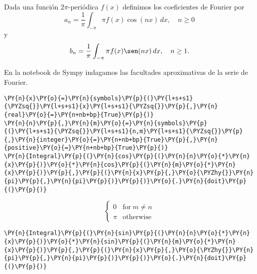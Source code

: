 \begin{definicion}{}
Dada una función $2\pi$-periódica $f(x)$ definimos los coeficientes de Fourier por
\begin{equation}
a_n=\frac{1}{\pi} \int_{-\pi}{\pi} f(x)\cos(nx)\,dx,\quad n\geq 0
\end{equation}
y 
\begin{equation}
b_n=\frac{1}{\pi} \int_{-\pi}{\pi} f(x)\sen(nx)\,dx,\quad n\geq 1.
\end{equation}
\end{definicion}

En la notebook de Sympy indagamos las facultades aproximativas de la serie de Fourier.
    \begin{tcolorbox}[breakable, size=fbox, boxrule=1pt, pad at break*=1mm,colback=cellbackground, colframe=cellborder]
\begin{Verbatim}[commandchars=\\\{\}]
\PY{n}{x}\PY{o}{=}\PY{n}{symbols}\PY{p}{(}\PY{l+s+s1}{\PYZsq{}}\PY{l+s+s1}{x}\PY{l+s+s1}{\PYZsq{}}\PY{p}{,}\PY{n}{real}\PY{o}{=}\PY{n+nb+bp}{True}\PY{p}{)}
\PY{n}{n}\PY{p}{,}\PY{n}{m}\PY{o}{=}\PY{n}{symbols}\PY{p}{(}\PY{l+s+s1}{\PYZsq{}}\PY{l+s+s1}{n,m}\PY{l+s+s1}{\PYZsq{}}\PY{p}{,}\PY{n}{integer}\PY{o}{=}\PY{n+nb+bp}{True}\PY{p}{,}\PY{n}{positive}\PY{o}{=}\PY{n+nb+bp}{True}\PY{p}{)}
\PY{n}{Integral}\PY{p}{(}\PY{n}{cos}\PY{p}{(}\PY{n}{n}\PY{o}{*}\PY{n}{x}\PY{p}{)}\PY{o}{*}\PY{n}{cos}\PY{p}{(}\PY{n}{m}\PY{o}{*}\PY{n}{x}\PY{p}{)}\PY{p}{,}\PY{p}{(}\PY{n}{x}\PY{p}{,}\PY{o}{\PYZhy{}}\PY{n}{pi}\PY{p}{,}\PY{n}{pi}\PY{p}{)}\PY{p}{)}\PY{o}{.}\PY{n}{doit}\PY{p}{(}\PY{p}{)}
\end{Verbatim}
\end{tcolorbox}
 
            
    
    $$\begin{cases} 0 & \text{for}\: m \neq n \\\pi & \text{otherwise} \end{cases}$$

    

    \begin{tcolorbox}[breakable, size=fbox, boxrule=1pt, pad at break*=1mm,colback=cellbackground, colframe=cellborder]
\begin{Verbatim}[commandchars=\\\{\}]
\PY{n}{Integral}\PY{p}{(}\PY{n}{sin}\PY{p}{(}\PY{n}{n}\PY{o}{*}\PY{n}{x}\PY{p}{)}\PY{o}{*}\PY{n}{sin}\PY{p}{(}\PY{n}{m}\PY{o}{*}\PY{n}{x}\PY{p}{)}\PY{p}{,}\PY{p}{(}\PY{n}{x}\PY{p}{,}\PY{o}{\PYZhy{}}\PY{n}{pi}\PY{p}{,}\PY{n}{pi}\PY{p}{)}\PY{p}{)}\PY{o}{.}\PY{n}{doit}\PY{p}{(}\PY{p}{)}
\end{Verbatim}
\end{tcolorbox}
 
